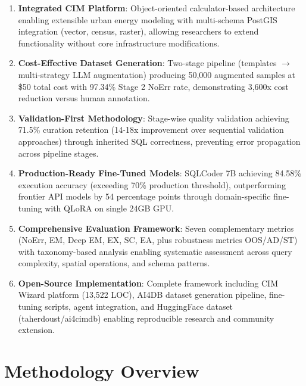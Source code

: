 \begin{enumerate}[leftmargin=1.2em]
  \item \textbf{Integrated CIM Platform}: Object-oriented calculator-based architecture enabling extensible urban energy modeling with multi-schema PostGIS integration (vector, census, raster), allowing researchers to extend functionality without core infrastructure modifications.
  
  \item \textbf{Cost-Effective Dataset Generation}: Two-stage pipeline (templates $\rightarrow$ multi-strategy LLM augmentation) producing 50,000 augmented samples at \$50 total cost with 97.34\% Stage 2 NoErr rate, demonstrating 3,600x cost reduction versus human annotation.
  
  \item \textbf{Validation-First Methodology}: Stage-wise quality validation achieving 71.5\% curation retention (14-18x improvement over sequential validation approaches) through inherited SQL correctness, preventing error propagation across pipeline stages.
  
  \item \textbf{Production-Ready Fine-Tuned Models}: SQLCoder 7B achieving 84.58\% execution accuracy (exceeding 70\% production threshold), outperforming frontier API models by 54 percentage points through domain-specific fine-tuning with QLoRA on single 24GB GPU.
  
  \item \textbf{Comprehensive Evaluation Framework}: Seven complementary metrics (NoErr, EM, Deep EM, EX, SC, EA, plus robustness metrics OOS/AD/ST) with taxonomy-based analysis enabling systematic assessment across query complexity, spatial operations, and schema patterns.
  
  \item \textbf{Open-Source Implementation}: Complete framework including CIM Wizard platform (13,522 LOC), AI4DB dataset generation pipeline, fine-tuning scripts, agent integration, and HuggingFace dataset (taherdoust/ai4cimdb) enabling reproducible research and community extension.
\end{enumerate}

\section{Methodology Overview}

